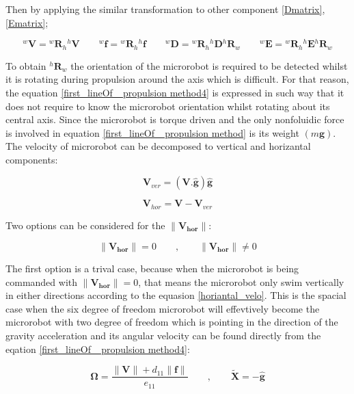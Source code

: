 \documentclass[12pt,a4paper,titlepage]{report}
\begin{document}
Then by applying the similar transformation to other component \ref{Dmatrix}, \ref{Ematrix};

\begin{equation}
^{w}\bm{V}  = {^{w}\bm{R}_h}{^{h}\bm{V}}  \qquad  ^{w}\bm{f}  = {^{w}\bm{R}_h}{^{h}\bm{f}}
\qquad  ^{w}\bm{D}  = {^{w}\bm{R}_h}{^{h}\bm{D}} {^{h}\bm{R}_w}
\qquad  ^{w}\bm{E}  = {^{w}\bm{R}_h}{^{h}\bm{E}} {^{h}\bm{R}_w}
\label{first_lineOf_ propulsion method5}  
\end{equation}

 To obtain ${^{h}\bm{R}_w}$ the orientation of the microrobot is required to be detected 
whilst it is rotating during propulsion around the axis which is difficult. For that reason, the equation
\ref{first_lineOf_ propulsion method4} is expressed in such way that it does not require to know the
microrobot orientation whilst rotating about its central axis. Since the microrobot is torque driven and the only 
nonfoluidic force is involved in equation \ref{first_lineOf_ propulsion method} is its weight $(m \bm{g})$. The 
velocity of microrobot can be decomposed to vertical and horizantal components:

 \begin{equation}
\bm{V}_{ver} = (\bm{V . \hat{g}})\bm{\hat {g}}
\label{vertical_velo}
\end{equation}


\begin{equation}
\bm{V}_{hor} = \bm{V} - \bm{V}_{ver}  
\label{horiantal_velo}
\end{equation}

Two options can be considered for the ${\| \bm {{V}_{hor}}\|}$:


\begin{equation}
 {\| \bm {{V}_{hor}}\|}  = 0 \qquad ,  \qquad  {\| \bm{{V}_{hor}}\|} \neq 0
\label{total_force_torque}
\end{equation}

The first option is a trival case, because when the microrobot is being commanded with
$ {\| \bm {{V}_{hor}}\|}  = 0$, that means the microrobot only swim vertically in either 
directions according to the equasion \ref{horiantal_velo}. This is the spacial case when the six degree of
freedom microrobot will effevtively become the microrobot with two degree of freedom which is pointing
in the direction of the gravity acceleration and its angular velocity can be found directly from the eqation
\ref{first_lineOf_ propulsion method4}:


\begin{equation}
 \bm {\Omega}  = \frac{{\| \bm{V}\|}+ d_{11}\| \bm{f}\|}{e_{11}}  \qquad ,  \qquad  \tilde{\bm{X}} = -\hat{\bm{g}}
\label{angular_velo_horiVelo=0}
\end{equation}
\end{document}
